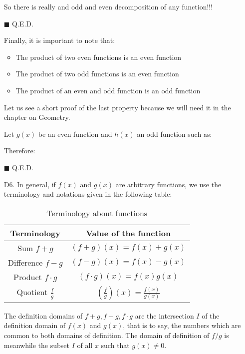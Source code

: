 \begin{enumerate}
\begin{dem}
		So there is really and odd and even decomposition of any function!!!
		\begin{flushright}
			$\blacksquare$  Q.E.D.
		\end{flushright}
		\end{dem}
		Finally, it is important to note that:
		\begin{itemize}
			\item The product of two even functions is an even function
			\item The product of two odd functions is an even function
			\item The product of an even and odd function is an odd function
		\end{itemize}
		Let us see a short proof of the last property because we will need it in the chapter on Geometry.
		\begin{dem}
		Let $g(x)$ be an even function and $h(x)$ an odd function such as:
		
		Therefore:
		
		\begin{flushright}
			$\blacksquare$  Q.E.D.
		\end{flushright}
		\end{dem}
		\item[D6.] In general, if $f (x)$ and $g (x)$ are arbitrary functions, we use the terminology and notations given in the following table:
		\begin{table}[H]	
			\centering
			\begin{tabular}{|c|c|}
			  \hline
			  \rowcolor[gray]{0.75}\textbf{Terminology}&\textbf{Value of the function}\\
			  \hline
			  Sum $f+g$ & $(f+g)(x)=f(x)+g(x)$ \\\hline
			  Difference $f-g$ & $(f-g)(x)=f(x)-g(x)$ \\\hline
			  Product $f \cdot g$ & $(f \cdot g)(x)=f(x)g(x)$ \\\hline
			  Quotient $\displaystyle\frac{f}{g}$&$\left(\displaystyle\frac{f}{g}\right)(x)=\displaystyle\frac{f(x)}{g(x)}$ \\\hline
			\end{tabular}
			\caption{Terminology about functions}
		\end{table}
		The definition domains of $f+g,f-g,f\cdot g$ are the intersection $I$ of the definition domain of $f (x)$ and $g(x)$, that is to say, the numbers which are common to both domains of definition. The domain of definition of $f/g$ is meanwhile the subset $I$ of all $x$ such that  $g(x)\neq 0$.
		

\end{enumerate}
